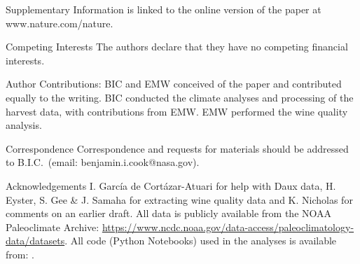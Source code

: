 \documentclass[final]{nature}
\begin{document}
\pagebreak 
\begin{addendum}
 \item [Supplementary Information] is linked to the online version of the paper at www.nature.com/nature.
 \item[Competing Interests] The authors declare that they have no competing financial interests.
\item [Author Contributions:] BIC and EMW conceived of the paper and contributed equally to the writing. BIC conducted the climate analyses and processing of the harvest data, with contributions from EMW. EMW performed the wine quality analysis.
 \item[Correspondence] Correspondence and requests for materials
should be addressed to B.I.C.~(email: benjamin.i.cook@nasa.gov).
 \item[Acknowledgements] I. Garc\'ia de Cort\'azar-Atuari for help with Daux data, H. Eyster, S. Gee \& J. Samaha for extracting wine quality data and K. Nicholas for comments on an earlier draft. All data is publicly available from the NOAA Paleoclimate Archive: \url{https://www.ncdc.noaa.gov/data-access/paleoclimatology-data/datasets}. All code (Python Notebooks) used in the analyses is available from: .
\end{addendum}
\end{document}

